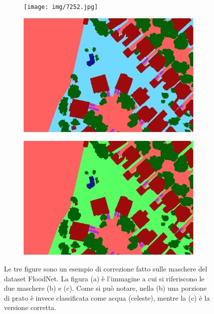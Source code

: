 \begin{figure}[h!]
    \centering
    \begin{subfigure}[b]{0.6\textwidth}
        \centering
        \texttt{[image: img/7252.jpg]}
        \caption{}
        \label{}
    \end{subfigure}
    \hfill
    \begin{subfigure}[b]{0.45\textwidth}
        \centering
        \includegraphics[width=\textwidth]{img/7252_lab.png}
        \caption{}
        \label{}
    \end{subfigure}
    \hfill
    \begin{subfigure}[b]{0.45\textwidth}
        \centering
        \includegraphics[width=\textwidth]{img/7252_lab 2.png}
        \caption{}
        \label{}
    \end{subfigure}
    \caption{Le tre figure sono un esempio di correzione fatto sulle maschere del dataset FloodNet. La figura (a) è l'immagine a cui si riferiscono le due maschere (b) e (c). Come si può notare, nella (b) una porzione di prato è invece classificata come acqua (celeste), mentre la (c) è la versione corretta.}
    \label{fig:esempio_correzioni}
\end{figure}

